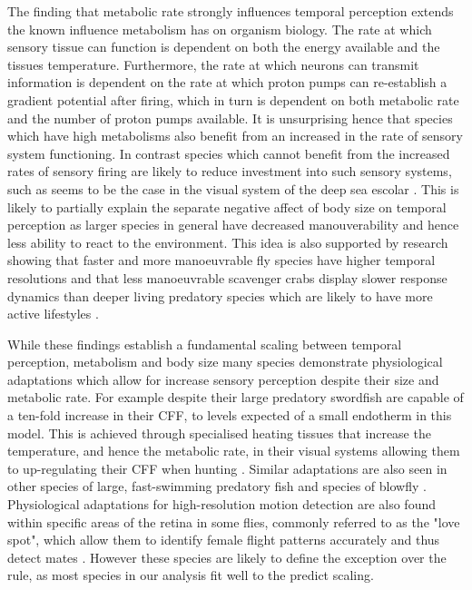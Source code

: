 The finding that metabolic rate strongly influences temporal perception extends the known influence metabolism has on organism biology. The rate at which sensory tissue can function is dependent on both the energy available and the tissues temperature. Furthermore, the rate at which neurons can transmit information is dependent on the rate at which proton pumps can re-establish a gradient potential after firing, which in turn is dependent on both metabolic rate \citep{laughlin2001energy} and the number of proton pumps available. It is unsurprising hence that species which have high metabolisms also benefit from an increased in the rate of sensory system functioning. In contrast species which cannot benefit from the increased rates of sensory firing are likely to reduce investment into such sensory systems, such as seems to be the case in the visual system of the deep sea escolar \citep{landgren2014visual}. This is likely to partially explain the separate negative affect of body size on temporal perception as larger species in general have decreased manouverability \citep{heglund1988speed,dudley2002mechanisms,biewener2003animal,sato2007stroke,vogel2008modes,hedrick2011damping,watanabe2012slowest} and hence less ability to react to the environment. This idea is also supported by research showing that faster and more manoeuvrable fly species have higher temporal resolutions \citep{laughlin1993fast} and that less manoeuvrable scavenger crabs display slower response dynamics than deeper living predatory species which are likely to have more active lifestyles \citep{frank2012light}. 


While these findings establish a fundamental scaling between temporal perception, metabolism and body size many species demonstrate physiological adaptations which allow for increase sensory perception despite their size and metabolic rate. For example despite their large predatory swordfish \citep{fritsches2005warm} are capable of a ten-fold increase in their CFF, to levels expected of a small endotherm in this model. This is achieved through specialised heating tissues that increase the temperature, and hence the metabolic rate, in their visual systems allowing them to up-regulating their CFF when hunting \citep{fritsches2005warm}. Similar adaptations are also seen in other species of large, fast-swimming predatory fish \citep{carey1982brain,block1985warm} and species of blowfly \citep{tatler2000temperature}. Physiological adaptations for high-resolution motion detection are also found within specific areas of the retina in some flies, commonly referred to as the "love spot", which allow them to identify female flight patterns accurately and thus detect mates \citep{land1974chasing}. However these species are likely to define the exception over the rule, as most species in our analysis fit well to the predict scaling.


